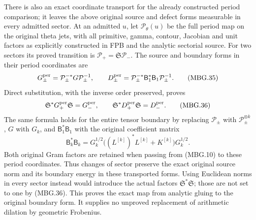 There is also an exact coordinate transport for the already constructed
period comparison; it leaves the above original source and defect
forms measurable in every admitted sector. At an admitted \(u\), let
\(\mathcal P_\theta(u)\) be the full period map on the original theta
jets, with all primitive, gamma, contour, Jacobian and unit factors
as explicitly constructed in FPB and the analytic sectorial source.
For two sectors its proved transition is
\(\mathcal P_+=\mathfrak S\mathcal P_-\).
The source and boundary forms in their period coordinates are
\[
 G^{\rm per}_\pm=\mathcal P_\pm^{-*}G\mathcal P_\pm^{-1},
 \qquad
 D^{\rm per}_\pm=\mathcal P_\pm^{-*}\mathsf B_1^*\mathsf B_1
                                            \mathcal P_\pm^{-1}.
 \tag{MBG.35}\label{GraphV2:eq:mbg-period-forms}
\]
Direct substitution, with the inverse order preserved, proves
\[
 \mathfrak S^*G^{\rm per}_+\mathfrak S=G^{\rm per}_-,\qquad
 \mathfrak S^*D^{\rm per}_+\mathfrak S=D^{\rm per}_- .
 \tag{MBG.36}\label{GraphV2:eq:mbg-period-isometry}
\]
The same formula holds for the entire tensor boundary by replacing
\(\mathcal P_\pm\) with \(\mathcal P_\pm^{\otimes k}\),
\(G\) with \(G_k\), and \(\mathsf B_1^*\mathsf B_1\) with the
original coefficient matrix
\[
 \mathsf B_k^*\mathsf B_k
   =G_k^{1/2}\bigl((L^{[k]})^*L^{[k]}+K^{[k]}\bigr)G_k^{1/2}.
 \tag{MBG.37}\label{GraphV2:eq:mbg-original-boundary-matrix}
\]
Both original Gram factors are retained when passing from (MBG.10)
to these period coordinates. Thus changes of sector preserve the exact
original source norm and its boundary energy in these transported
forms. Using Euclidean norms in every sector instead would introduce
the actual factors \(\mathfrak S^*\mathfrak S\); those are not set to
one by (MBG.36). This proves the exact map from analytic gluing to the
original boundary form. It supplies no unproved replacement of
arithmetic dilation by geometric Frobenius.
